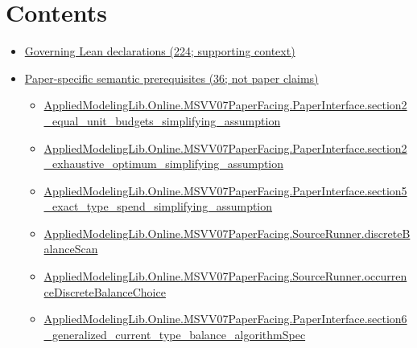 \documentclass[10pt]{article}
\begin{document}
\section*{Contents}
\begin{itemize}[leftmargin=1.2em]
\item \hyperlink{governing-declaration-section-5ef5ef0364b6939c}{Governing Lean declarations (224; supporting context)}
\item \hyperlink{paper-prerequisite-section-5ef5ef0364b6939c}{Paper-specific semantic prerequisites (36; not paper claims)}
\begin{itemize}[leftmargin=1.2em]
\item \hyperlink{paper-prerequisite-cb9dfba974e984d2}{Applied\allowbreak{}Modeling\allowbreak{}Lib.\allowbreak{}Online.\allowbreak{}MSVV07\allowbreak{}Paper\allowbreak{}Facing.\allowbreak{}Paper\allowbreak{}Interface.\allowbreak{}section2\_\allowbreak{}equal\_\allowbreak{}unit\_\allowbreak{}budgets\_\allowbreak{}simplifying\_\allowbreak{}assumption}
\item \hyperlink{paper-prerequisite-f2901dc931b4428a}{Applied\allowbreak{}Modeling\allowbreak{}Lib.\allowbreak{}Online.\allowbreak{}MSVV07\allowbreak{}Paper\allowbreak{}Facing.\allowbreak{}Paper\allowbreak{}Interface.\allowbreak{}section2\_\allowbreak{}exhaustive\_\allowbreak{}optimum\_\allowbreak{}simplifying\_\allowbreak{}assumption}
\item \hyperlink{paper-prerequisite-247f93fe57a5dab4}{Applied\allowbreak{}Modeling\allowbreak{}Lib.\allowbreak{}Online.\allowbreak{}MSVV07\allowbreak{}Paper\allowbreak{}Facing.\allowbreak{}Paper\allowbreak{}Interface.\allowbreak{}section5\_\allowbreak{}exact\_\allowbreak{}type\_\allowbreak{}spend\_\allowbreak{}simplifying\_\allowbreak{}assumption}
\item \hyperlink{paper-prerequisite-67f443bf0ff68608}{Applied\allowbreak{}Modeling\allowbreak{}Lib.\allowbreak{}Online.\allowbreak{}MSVV07\allowbreak{}Paper\allowbreak{}Facing.\allowbreak{}Source\allowbreak{}Runner.\allowbreak{}discrete\allowbreak{}Balance\allowbreak{}Scan}
\item \hyperlink{paper-prerequisite-8c5fc45bd0b54d7b}{Applied\allowbreak{}Modeling\allowbreak{}Lib.\allowbreak{}Online.\allowbreak{}MSVV07\allowbreak{}Paper\allowbreak{}Facing.\allowbreak{}Source\allowbreak{}Runner.\allowbreak{}occurrence\allowbreak{}Discrete\allowbreak{}Balance\allowbreak{}Choice}
\item \hyperlink{paper-prerequisite-2cdff4edd7dcdee0}{Applied\allowbreak{}Modeling\allowbreak{}Lib.\allowbreak{}Online.\allowbreak{}MSVV07\allowbreak{}Paper\allowbreak{}Facing.\allowbreak{}Paper\allowbreak{}Interface.\allowbreak{}section6\_\allowbreak{}generalized\_\allowbreak{}current\_\allowbreak{}type\_\allowbreak{}balance\_\allowbreak{}algorithm\allowbreak{}Spec}

\end{itemize}
\end{itemize}
\end{document}
